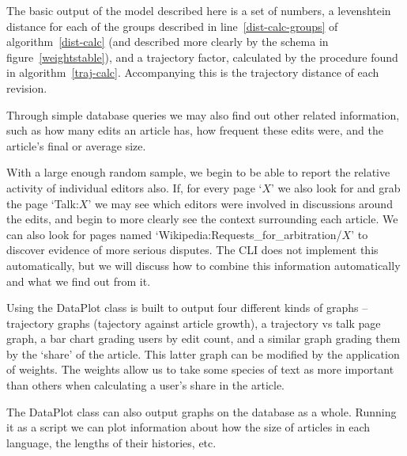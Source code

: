 The basic output of the model described here is a set of numbers, a
levenshtein distance for each of the groups described in
line~\ref{dist-calc-groups} of algorithm~\ref{dist-calc} (and
described more clearly by the schema in figure~\ref{weightstable}),
and a trajectory factor, calculated by the procedure found in
algorithm~\ref{traj-calc}. Accompanying this is the trajectory
distance of each revision.

Through simple database queries we may also find out other related
information, such as how many edits an article has, how frequent these
edits were, and the article's final or average size.

With a large enough random sample, we begin to be able to report the
relative activity of individual editors also. If, for every page `$X$'
we also look for and grab the page `Talk:$X$' we may see which editors
were involved in discussions around the edits, and begin to more
clearly see the context surrounding each article. We can also look for
pages named `Wikipedia:Requests\_for\_arbitration/$X$' to discover
evidence of more serious disputes. The CLI does not implement this
automatically, but we will discuss how to combine this information
automatically and what we find out from it.

Using the DataPlot class is built to output four different kinds of
graphs -- trajectory graphs (tajectory against article growth), a
trajectory vs talk page graph, a bar chart grading users by edit
count, and a similar graph grading them by the `share' of the
article. This latter graph can be modified by the application of
weights. The weights allow us to take some species of text as more
important than others when calculating a user's share in the article.

The DataPlot class can also output graphs on the database as a
whole. Running it as a script we can plot information about how the
size of articles in each language, the lengths of their histories,
etc.
